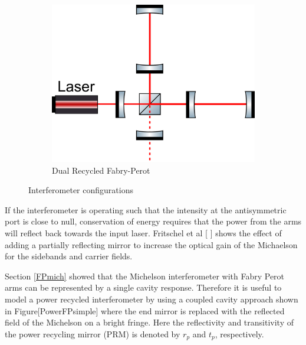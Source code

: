 \begin{figure}[ht]
			\begin{subfigure}[b]{0.3\textwidth}
				\centering
				\includegraphics[width=\textwidth]{../Figures/DRFP_Mich.png}
				\caption{Dual Recycled Fabry-Perot}
				\label{fig:DRFPMich}
			\end{subfigure}
			\caption{Interferometer configurations}
			\label{fig:three graphs}
		\end{figure}

		If the interferometer is operating such that the intensity at the antisymmetric port is close to null, conservation of energy requires that the power from the arms will reflect back towards the input laser.  Fritschel et al [\cite{Fritschel_Readout} \cite{FritschelLightRecycling}] shows the effect of adding a partially reflecting mirror to increase the optical gain of the Michaelson for the sidebands and carrier fields.
		
		Section \ref{FPmich} showed that the Michelson interferometer with Fabry Perot arms can be represented by a single cavity response.  Therefore it is useful to model a power recycled interferometer by using a coupled cavity approach shown in Figure[PowerFPsimple] where the end mirror is replaced with the reflected field of the Michelson on a bright fringe.  Here the reflectivity and transitivity of the power recycling mirror (PRM) is denoted by $r_p$ and $t_p$, respectively.  
		
